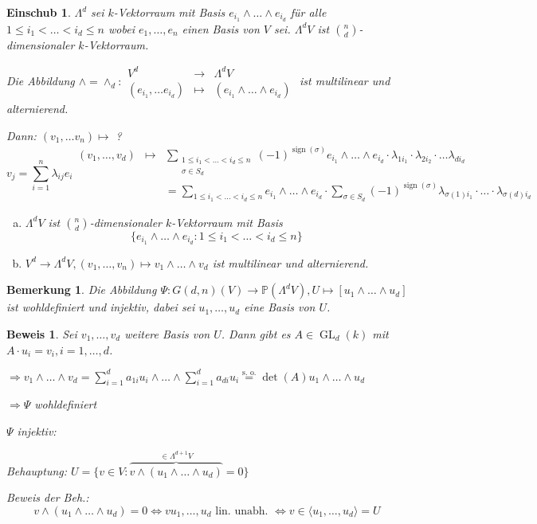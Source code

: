 \documentclass[a4paper, 12pt, numbers=noendperiod, chapterprefix=true]{scrbook}
\theoremstyle{break}
\newtheorem{Bem}[Def]{Bemerkung}
\newtheorem{Einsch}[Def]{Einschub}
\theoremstyle{nonumberbreak}
\newtheorem{Bew}{Beweis}
\theoremstyle{nonumberplain}
\newcommand{\Sum}{\sum\limits}
\DeclareMathOperator{\sign}{sign}
\DeclareMathOperator{\GL}{GL}
\newcommand{\IP}{\mathbb{P}}%
\begin{document}
\begin{Einsch}
$\Lambda^d$ sei $k$-Vektorraum mit Basis $e_{i_1}\wedge\ldots \wedge e_{i_d}$ f\"ur alle $1\le i_1 < \ldots < i_d \le n$ wobei $e_1,\ldots ,e_n$ einen Basis von $V$ sei. $\Lambda^dV$ ist $\binom{n}{d}$-dimensionaler $k$-Vektorraum.

Die Abbildung $\wedge=\wedge_d:\begin{array}{rcl} V^d &\to& \Lambda^dV\\ (e_{i_1},\ldots e_{i_d}) &\mapsto& (e_{i_1}\wedge\ldots \wedge e_{i_d})\end{array}$ ist multilinear und alternierend.\

\emph{Dann}: $(v_1,\ldots v_n)\mapsto$ ?
	\[v_j=\Sum_{i=1}^n\lambda_{ij}e_i
	\begin{array}{rcl}
		(v_1,\ldots ,v_d)&\mapsto& \Sum_{\substack{1\le i_1<\ldots <i_d\le n\\\sigma \in S_d}}(-1)^{\sign(\sigma)}e_{i_1}\wedge\ldots \wedge e_{i_d}\cdot \lambda_{1i_1}\cdot \lambda_{2i_2}\cdot\ldots \lambda_{di_d} \\
		&&= \Sum_{1\le i_1 <\ldots <i_d\le n} e_{i_1}\wedge\ldots \wedge e_{i_d}\cdot \Sum_{\sigma \in S_d}(-1)^{\sign(\sigma)}\lambda_{\sigma(1)i_1}\cdot \ldots \cdot \lambda_{\sigma(d)i_d}
	\end{array}\]
\begin{enumerate}[a)]

\item
	$\Lambda^dV$ ist $\binom{n}{d}$-dimensionaler $k$-Vektorraum mit Basis
		\[\{  e_{i_1}\wedge\ldots \wedge e_{i_d} : 1\le i_1 <\ldots <i_d\le n \}\]
\item
	$V^d\to \Lambda^dV, (v_1,\ldots ,v_n)\mapsto v_1\wedge\ldots \wedge v_d$ ist multilinear und alternierend.
\end{enumerate}\end{Einsch}

\begin{Bem}
Die Abbildung $\Psi:G(d,n)(V)\to \IP(\Lambda^dV), U\mapsto [u_1\wedge\ldots \wedge u_d]$ ist wohldefiniert und injektiv, dabei sei $u_1,\ldots ,u_d$ eine Basis von $U$.
\end{Bem}

\begin{Bew}
Sei $v_1,\ldots ,v_d$ weitere Basis von $U$. Dann gibt es $A\in \GL_d(k)$ mit $A\cdot u_i = v_i, i=1,\ldots ,d$.

$\Rightarrow v_1\wedge\ldots \wedge v_d = \Sum_{i=1}^da_{1i}u_i\wedge\ldots  \wedge \Sum_{i=1}^d a_{di}u_i \overset{\text{s. o.}}{=} \det(A) u_1\wedge \ldots \wedge u_d$

$\Rightarrow \Psi$ wohldefiniert

\emph{$\Psi$ injektiv}:

\emph{Behauptung:} $U=\{v\in V : \overbrace{v\wedge(u_1\wedge\ldots \wedge u_d)}^{\in \Lambda^{d+1}V}=0\}$

\emph{Beweis der Beh.:}
	\[v\wedge(u_1\wedge\ldots \wedge u_d)=0\Leftrightarrow vu_1,\ldots ,u_d \text{ lin. unabh. } \Leftrightarrow v\in \langle u_1,\ldots ,u_d\rangle =U\]
\end{Bew}
\end{document}

